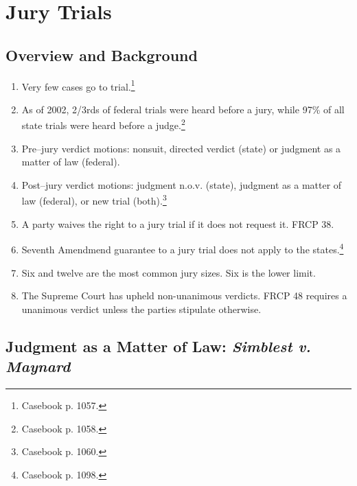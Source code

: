\section{Jury Trials}

\subsection{Overview and Background}

\begin{enumerate}
    \item Very few cases go to trial.\footnote{Casebook p. 1057.}
    \item As of 2002, 2/3rds of federal trials were heard before a jury, while 97\% of all state trials were heard before a judge.\footnote{Casebook p. 1058.}
    \item Pre--jury verdict motions: nonsuit, directed verdict (state) or judgment as a matter of law (federal).
    \item Post--jury verdict motions: judgment n.o.v. (state), judgment as a matter of law (federal), or new trial (both).\footnote{Casebook p. 1060.}
    \item A party waives the right to a jury trial if it does not request it. FRCP 38.
    \item Seventh Amendmend guarantee to a jury trial does not apply to the states.\footnote{Casebook p. 1098.}
    \item Six and twelve are the most common jury sizes. Six is the lower limit.
    \item The Supreme Court has upheld non-unanimous verdicts. FRCP 48 requires a unanimous verdict unless the parties stipulate otherwise.
\end{enumerate}

\subsection{Judgment as a Matter of Law: \emph{Simblest v. Maynard}}

